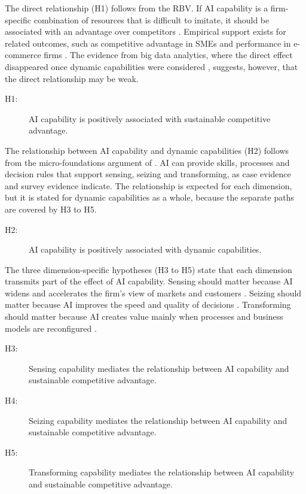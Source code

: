 The direct relationship (H1) follows from the RBV. If AI capability is a firm-specific combination of resources that is difficult to imitate, it should be associated with an advantage over competitors \parencite{mikalef2021ai, kemp2024}. Empirical support exists for related outcomes, such as competitive advantage in SMEs \parencite{shao2026} and performance in e-commerce firms \parencite{chen2022}. The evidence from big data analytics, where the direct effect disappeared once dynamic capabilities were considered \parencite{mikalef2020}, suggests, however, that the direct relationship may be weak.

\begin{description}
  \item[H1:] AI capability is positively associated with sustainable competitive advantage.
\end{description}

The relationship between AI capability and dynamic capabilities (H2) follows from the micro-foundations argument of \textcite{teece2007}. AI can provide skills, processes and decision rules that support sensing, seizing and transforming, as case evidence \parencite{mikalef2021b2b} and survey evidence \parencite{almheiri2025, le2024} indicate. The relationship is expected for each dimension, but it is stated for dynamic capabilities as a whole, because the separate paths are covered by H3 to H5.

\begin{description}
  \item[H2:] AI capability is positively associated with dynamic capabilities.
\end{description}

The three dimension-specific hypotheses (H3 to H5) state that each dimension transmits part of the effect of AI capability. Sensing should matter because AI widens and accelerates the firm's view of markets and customers \parencite{huang2021, drydakis2022}. Seizing should matter because AI improves the speed and quality of decisions \parencite{neiroukh2025, chen2022}. Transforming should matter because AI creates value mainly when processes and business models are reconfigured \parencite{wambataguimdje2020, sjodin2021, shao2026}.

\begin{description}
  \item[H3:] Sensing capability mediates the relationship between AI capability and sustainable competitive advantage.
  \item[H4:] Seizing capability mediates the relationship between AI capability and sustainable competitive advantage.
  \item[H5:] Transforming capability mediates the relationship between AI capability and sustainable competitive advantage.
\end{description}

